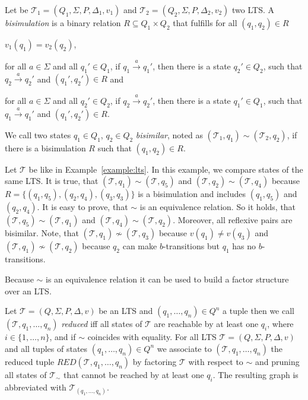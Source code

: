 \begin{definition}
    Let be $\mathcal{T}_1 = (Q_1, \Sigma, P, \Delta_1, v_1)$ and $\mathcal{T}_2 = (Q_2, \Sigma, P, \Delta_2, v_2)
    $ two LTS. A \emph{bisimulation} is a binary relation $R \subseteq Q_1 \times Q_2$ that fulfills for all $(q_1,
    q_2) \in R$
    \begin{compactitem}
        \item $v_1 (q_1) = v_2 (q_2)$,
        \item for all $a \in \Sigma$ and all $q_1' \in Q_1$, if $q_1 \overset{a}{\rightarrow} q_1'$, then there
        is a state $q_2' \in Q_2$, such that $q_2 \overset{a}{\rightarrow} q_2'$ and $(q_1', q_2') \in R$ and
        \item for all $a \in \Sigma$ and all $q_2' \in Q_2$, if $q_2 \overset{a}{\rightarrow} q_2'$, then there is a
        state $q_1' \in Q_1$, such that $q_1 \overset{a}{\rightarrow} q_1'$ and $(q_1', q_2') \in R$.
    \end{compactitem}
    We call two states $q_1 \in Q_1$, $q_2 \in Q_2$ \emph{bisimilar}, noted as $(\mathcal{T}_1, q_1) \sim
    (\mathcal{T}_2, q_2)$, if there
    is a bisimulation $R$ such that $(q_1, q_2) \in R$.
\end{definition}

\begin{example}
    \label{example:bisimilar}
    Let $\mathcal{T}$ be like in Example~\ref{example:lts}. In this example, we compare states of the same LTS. It is
    true, that $(\mathcal{T}, q_1) \sim (\mathcal{T}, q_5)$ and $(\mathcal{T}, q_2) \sim (\mathcal{T}, q_4)$ because
    $R = \{(q_1, q_5), (q_2, q_4), (q_3, q_3)\}$ is a bisimulation and includes $(q_1, q_5)$ and $(q_2, q_4)$. It is
    easy to prove, that $\sim$ is an equivalence relation. So it holds, that $(\mathcal{T}, q_5) \sim (\mathcal{T},
    q_1)$ and $(\mathcal{T}, q_4) \sim (\mathcal{T}, q_2)$. Moreover, all reflexive pairs are bisimilar. Note, that
    $(\mathcal{T}, q_1) \not\sim (\mathcal{T}, q_3)$ because $v(q_1) \neq v(q_3)$ and $(\mathcal{T}, q_1)
    \not\sim (\mathcal{T}, q_2)$ because $q_2$ can make $b$-transitions but $q_1$ has no $b$-transitions.
\end{example}

Because $\sim$ is an equivalence relation it can be used to build a factor structure over an LTS.

\begin{definition}
    \label{definition:reduced_lts}
    Let $\mathcal{T} = (Q, \Sigma, P, \Delta, v)$ be an LTS and $(q_1, \dots, q_n) \in Q^n$ a tuple then we call $
    (\mathcal{T}, q_1, \dots, q_n)$ \emph{reduced} iff all states of $\mathcal{T}$ are reachable by at
    least one $q_i$, where $i \in \{1, \dots, n\}$, and if $\sim$ coincides with equality. For all LTS $\mathcal{T} =
    (Q, \Sigma, P, \Delta, v)$ and all tuples of states $(q_1, \dots, q_n) \in Q^n$ we associate to $(\mathcal{T}, q_1,
    \dots, q_n)$ the reduced tuple $RED(\mathcal{T}, q_1, \dots, q_n)$ by factoring $\mathcal{T}$ with respect to
    $\sim$ and pruning all states of $\mathcal{T}_\sim$ that cannot be reached by at least one $q_i$. The resulting
    graph is abbreviated with $\mathcal{T}_{(q_1, \dots, q_n)}$.
\end{definition}

